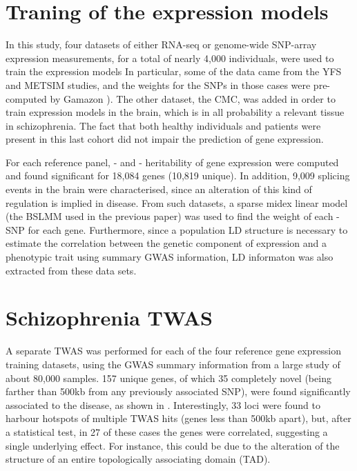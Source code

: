 \documentclass[../main.tex]{subfiles}
\begin{document}
\section{Traning of the expression models}

In this study, four datasets of either RNA-seq or genome-wide SNP-array 
expression measurements, for a total of nearly 4,000 individuals,  were 
used to train the expression models In particular, some 
of the data came from the YFS and METSIM studies, and the weights for 
the SNPs in those cases were pre-computed by Gamazon ). The 
other dataset, the CMC, was added in order to train expression models in 
the brain, which is in all probability a relevant tissue in 
schizophrenia. The fact that both healthy individuals and patients were 
present in this last cohort did not impair the prediction of gene 
expression.

For each reference panel, \cis- and \trans- heritability of gene 
expression were computed and found significant for 18,084 genes (10,819 
unique). In addition, 9,009 splicing events in the brain were 
characterised, since an alteration of this kind of regulation is implied 
in disease. From such datasets, a sparse midex linear model (the BSLMM 
used in the previous paper) was used to find the weight of each \cis-SNP 
for each gene. Furthermore, since a population LD structure is necessary 
to estimate the correlation between the genetic component of expression 
and a phenotypic trait using summary GWAS information, LD informaton was 
also extracted from these data sets.

\section{Schizophrenia TWAS}

A separate TWAS was performed for each of the four reference gene 
expression training datasets, using the GWAS summary information from a 
large study of about 80,000 samples. 157 unique genes, of which 35 
completely novel (\ie being farther than 500kb from any previously 
associated SNP), were found significantly associated to the disease, as 
shown in . Interestingly, 33 loci were found to 
harbour hotspots of multiple TWAS hits (\ie genes less than 500kb 
apart), but, after a statistical test, in 27 of these cases the genes 
were correlated, suggesting a single underlying effect. For instance, 
this could be due to the alteration of the structure of an entire 
topologically associating domain (TAD).
\end{document}
